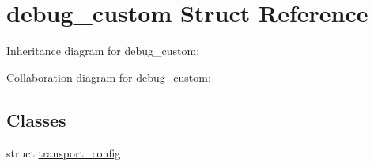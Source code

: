 \hypertarget{structdebug__custom}{}\section{debug\+\_\+custom Struct Reference}
\label{structdebug__custom}


Inheritance diagram for debug\+\_\+custom\+:


Collaboration diagram for debug\+\_\+custom\+:
\subsection*{Classes}
\begin{DoxyCompactItemize}
\item 
struct \mbox{\hyperlink{structdebug__custom_1_1transport__config}{transport\+\_\+config}}
\end{DoxyCompactItemize}
